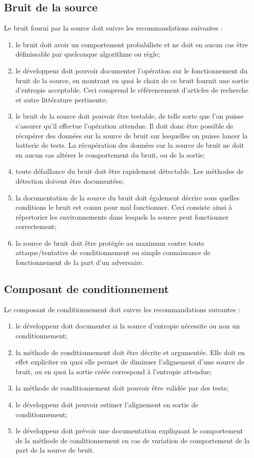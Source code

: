 \subsection{Bruit de la source}
Le bruit fourni par la source doit suivre les recommandations suivantes :
\begin{enumerate}
\item le bruit doit avoir un comportement probabiliste et ne doit en aucun cas être définissable par quelconque algorithme ou règle;
\item le développeur doit pouvoir documenter l'opération sur le fonctionnement du bruit de la source, en montrant en quoi le choix de ce bruit fournit une sortie d'entropie acceptable. Ceci comprend le référencement d'articles de recherche et autre littérature pertinente;
\item le bruit de la source doit pouvoir être testable, de telle sorte que l'on puisse s'assurer qu'il effectue l'opération attendue. Il doit donc être possible de récupérer des données sur la source de bruit sur lesquelles on puisse lancer la batterie de tests. La récupération des données sur la source de bruit ne doit en aucun cas altérer le comportement du bruit, ou de la sortie;
\item toute défaillance du bruit doit être rapidement détectable. Les méthodes de détection doivent être documentées;
\item la documentation de la source du bruit doit également décrire sous quelles conditions le bruit est connu pour mal fonctionner. Ceci consiste ainsi à répertorier les environnements dans lesquels la source peut fonctionner correctement; 
\item la source de bruit doit être protégée au maximum contre toute attaque/tentative de conditionnement ou simple connaissance de fonctionnement de la part d'un adversaire.\\
\end{enumerate}

\subsection{Composant de conditionnement}
Le composant de conditionnement doit suivre les recommandations suivantes :
\begin{enumerate}
\item le développeur doit documenter si la source d'entropie nécessite ou non un conditionnement;
\item la méthode de conditionnement doit être décrite et argumentée. Elle doit en effet expliciter en quoi elle permet de diminuer l'alignement d'une source de bruit, ou en quoi la sortie créée correspond à l'entropie attendue;
\item la méthode de conditionnement doit pouvoir être validée par des tests;
\item le développeur doit pouvoir estimer l'alignement en sortie de conditionnement; 
\item le développeur doit prévoir une documentation expliquant le comportement de la méthode de conditionnement en cas de variation de comportement de la part de la source de bruit.\\
\end{enumerate}

